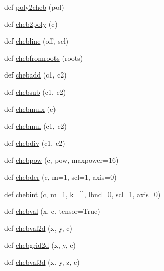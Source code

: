 \begin{DoxyCompactItemize}
\item 
def \hyperlink{namespacenumpy_1_1polynomial_1_1chebyshev_ac3147f174c1654fa14a00a56164e7972}{poly2cheb} (pol)
\item 
def \hyperlink{namespacenumpy_1_1polynomial_1_1chebyshev_a5b997d4c0cb4a18d2f283eeb2b30ee83}{cheb2poly} (c)
\item 
def \hyperlink{namespacenumpy_1_1polynomial_1_1chebyshev_abb7b73d1a72f6f6739660260618081c9}{chebline} (off, scl)
\item 
def \hyperlink{namespacenumpy_1_1polynomial_1_1chebyshev_ad77705a093f59a558144d099b7bb9c95}{chebfromroots} (roots)
\item 
def \hyperlink{namespacenumpy_1_1polynomial_1_1chebyshev_a5e6fa2e9bad3cf1e6ad2c0adaf625adb}{chebadd} (c1, c2)
\item 
def \hyperlink{namespacenumpy_1_1polynomial_1_1chebyshev_af87a2ff163377e32886c2da91bdaf444}{chebsub} (c1, c2)
\item 
def \hyperlink{namespacenumpy_1_1polynomial_1_1chebyshev_a8d453d12c44374a7a98a3bd61f59c9af}{chebmulx} (c)
\item 
def \hyperlink{namespacenumpy_1_1polynomial_1_1chebyshev_accc03e34234155d96a6c6f3217c06578}{chebmul} (c1, c2)
\item 
def \hyperlink{namespacenumpy_1_1polynomial_1_1chebyshev_ade0590b0e276cb9e062a58085444acda}{chebdiv} (c1, c2)
\item 
def \hyperlink{namespacenumpy_1_1polynomial_1_1chebyshev_ae3af64bbb5a7e893626292b6cc193ae9}{chebpow} (c, pow, maxpower=16)
\item 
def \hyperlink{namespacenumpy_1_1polynomial_1_1chebyshev_a9bfa98102b617d06df5d0e872a7a00b9}{chebder} (c, m=1, scl=1, axis=0)
\item 
def \hyperlink{namespacenumpy_1_1polynomial_1_1chebyshev_aa40d9c6238fb99b12076206699a57f27}{chebint} (c, m=1, k=\mbox{[}$\,$\mbox{]}, lbnd=0, scl=1, axis=0)
\item 
def \hyperlink{namespacenumpy_1_1polynomial_1_1chebyshev_a8c29a244f70afca7102faf8882e20902}{chebval} (x, c, tensor=True)
\item 
def \hyperlink{namespacenumpy_1_1polynomial_1_1chebyshev_a1087d7c7038cdb34464d6a700543145f}{chebval2d} (x, y, c)
\item 
def \hyperlink{namespacenumpy_1_1polynomial_1_1chebyshev_aaecf6fa412715f5d8b819ea9d25f7868}{chebgrid2d} (x, y, c)
\item 
def \hyperlink{namespacenumpy_1_1polynomial_1_1chebyshev_a12bb46a428c4f1b3389bd522b0bd0dbc}{chebval3d} (x, y, z, c)

\end{DoxyCompactItemize}
